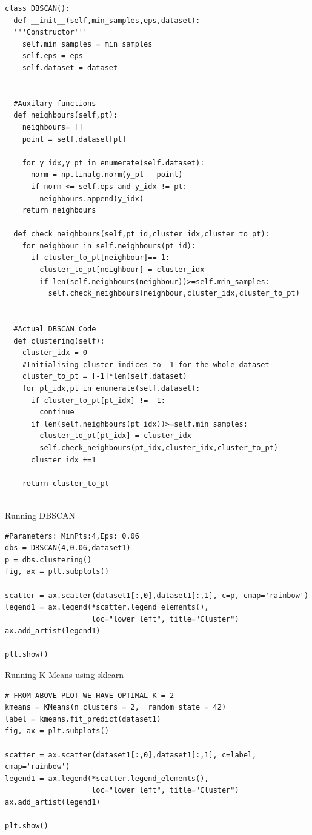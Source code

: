 \documentclass[12pt,letterpaper, onecolumn]{exam}
\begin{document}
 
\begin{lstlisting}
class DBSCAN():
  def __init__(self,min_samples,eps,dataset):
  '''Constructor'''
    self.min_samples = min_samples
    self.eps = eps
    self.dataset = dataset
   
  
  #Auxilary functions
  def neighbours(self,pt):
    neighbours= []
    point = self.dataset[pt]
    
    for y_idx,y_pt in enumerate(self.dataset):
      norm = np.linalg.norm(y_pt - point)
      if norm <= self.eps and y_idx != pt:
        neighbours.append(y_idx)
    return neighbours

  def check_neighbours(self,pt_id,cluster_idx,cluster_to_pt):
    for neighbour in self.neighbours(pt_id):
      if cluster_to_pt[neighbour]==-1:
        cluster_to_pt[neighbour] = cluster_idx
        if len(self.neighbours(neighbour))>=self.min_samples:
          self.check_neighbours(neighbour,cluster_idx,cluster_to_pt)


  #Actual DBSCAN Code  
  def clustering(self):
    cluster_idx = 0
    #Initialising cluster indices to -1 for the whole dataset
    cluster_to_pt = [-1]*len(self.dataset)
    for pt_idx,pt in enumerate(self.dataset):
      if cluster_to_pt[pt_idx] != -1:
        continue
      if len(self.neighbours(pt_idx))>=self.min_samples:
        cluster_to_pt[pt_idx] = cluster_idx
        self.check_neighbours(pt_idx,cluster_idx,cluster_to_pt)
      cluster_idx +=1

    return cluster_to_pt 
            

\end{lstlisting}
\newpage
Running DBSCAN

\begin{lstlisting}
#Parameters: MinPts:4,Eps: 0.06
dbs = DBSCAN(4,0.06,dataset1)
p = dbs.clustering()
fig, ax = plt.subplots()

scatter = ax.scatter(dataset1[:,0],dataset1[:,1], c=p, cmap='rainbow')
legend1 = ax.legend(*scatter.legend_elements(),
                    loc="lower left", title="Cluster")
ax.add_artist(legend1)

plt.show()
\end{lstlisting}


Running K-Means using sklearn
\begin{lstlisting}
# FROM ABOVE PLOT WE HAVE OPTIMAL K = 2
kmeans = KMeans(n_clusters = 2,  random_state = 42)
label = kmeans.fit_predict(dataset1)
fig, ax = plt.subplots()

scatter = ax.scatter(dataset1[:,0],dataset1[:,1], c=label, cmap='rainbow')
legend1 = ax.legend(*scatter.legend_elements(),
                    loc="lower left", title="Cluster")
ax.add_artist(legend1)

plt.show()
\end{lstlisting}
\end{document}
